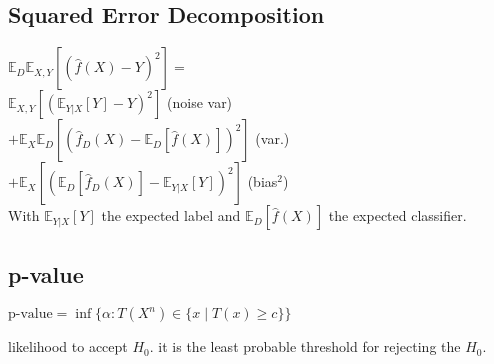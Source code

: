\subsection*{Squared Error Decomposition}
$\mathbb{E}_D\mathbb{E}_{X,Y}[(\hat{f}(X)-Y)^2]=$\\
$\mathbb{E}_{X,Y}[(\mathbb{E}_{Y|X}[Y]-Y)^2]$ (noise var)\\
$+\mathbb{E}_X\mathbb{E}_D[(\hat{f}_D(X)-\mathbb{E}_D[\hat{f}(X)])^2]$ (var.)\\
$+\mathbb{E}_X[(\mathbb{E}_D[\hat{f}_D(X)]-\mathbb{E}_{Y|X}[Y])^2]$ (bias$^2$)\\
With $\mathbb{E}_{Y|X}[Y]$ the expected label and $\mathbb{E}_{D}[\hat{f}(X)]$ the expected classifier.

\subsection*{p-value}
$\text{p-value} {=} \inf \{\alpha : T(X^n) {\in} \{ x {\mid} T(x) {\geq} c \} \}$

likelihood to accept $H_0$. it is the least probable threshold for rejecting the $H_0$.

